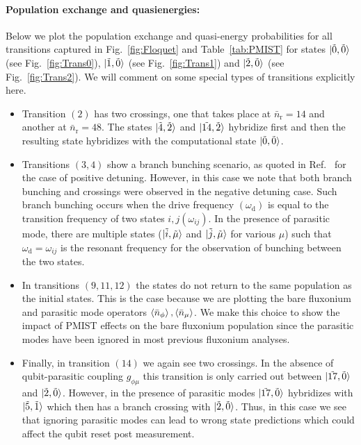 \documentclass[%
reprint,
superscriptaddress,
 amsmath,amssymb,
 aps,
 prx,
longbibliography,
floatfix,
]{revtex4-2}
\begin{document}
{\paragraph{Population exchange and quasienergies:}\label{app:Floquet-trans}
Below we plot the population exchange and quasi-energy probabilities for all transitions captured in Fig.~\ref{fig:Floquet} and Table~\ref{tab:PMIST} for states $\ket{\tilde{0},\tilde{0}}$ (see Fig.~\ref{fig:Trans0}), $\ket{\tilde{1},\tilde{0}}$ (see Fig.~\ref{fig:Trans1}) and $\ket{\tilde{2},\tilde{0}}$ (see Fig.~\ref{fig:Trans2}). We will comment on some special types of transitions explicitly here.

\begin{itemize}
    \item Transition $(2)$ has two crossings, one that takes place at $\bar n_\textrm{r}=14$ and another at $\bar n_\textrm{r}=48$. The states $\ket{\tilde{4},\tilde{2}}$ and $\ket{\tilde{14},\tilde{2}}$ hybridize first and then the resulting state hybridizes with the computational state $\ket{\tilde{0},\tilde{0}}$.
    \item Transitions $(3,4)$ show a branch bunching scenario, as quoted in Ref.~\cite{dumas2024unified} for the case of positive detuning. However, in this case we note that both branch bunching and crossings were observed in the negative detuning case. Such branch bunching occurs when the drive frequency $(\omega_\textrm{d})$ is equal to the transition frequency of two states $i,j (\omega_{ij})$. In the presence of parasitic mode, there are multiple states ($\ket{\tilde{i},\tilde{\mu
    }}$ and $\ket{\tilde{j},\tilde{\mu}}$ for various $\mu$) such that $\omega_\textrm{d}=\omega_{ij}$ is the resonant frequency for the observation of bunching between the two states.
    \item In transitions $(9,11,12)$ the states do not return to the same population as the initial states. This is the case because we are plotting the bare fluxonium and parasitic mode operators $\braket{\bar n_\phi},\braket{\bar n_\mu}$. We make this choice to show the impact of PMIST effects on the bare fluxonium population since the parasitic modes have been ignored in most previous fluxonium analyses.
    \item Finally, in transition $(14)$ we again see two crossings. In the absence of qubit-parasitic coupling $g_{\phi\mu}$ this transition is only carried out between  $\ket{\tilde{17},\tilde{0}}$ and $\ket{\tilde{2},\tilde{0}}$. However, in the presence of parasitic modes $\ket{\tilde{17},\tilde{0}}$ hybridizes with $\ket{\tilde{5},\tilde{1}}$ which then has a branch crossing with $\ket{\tilde{2},\tilde{0}}$. Thus, in this case we see that ignoring parasitic modes can lead to wrong state predictions which could affect the qubit reset post measurement.
\end{itemize}

}
\end{document}
